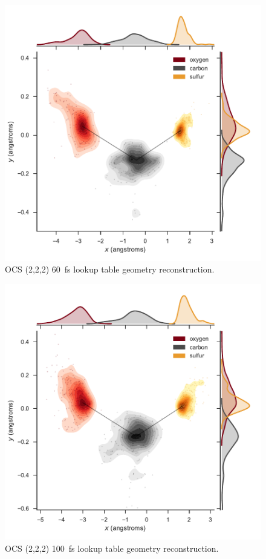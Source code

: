 \begin{figure}
  \centering
  \includegraphics[width=\textwidth]{Plots/OCS22260fsLTGeometry}
  \caption[OCS (2,2,2) \SI{60}{\fs} lookup table geometry reconstruction.]
  {OCS (2,2,2) \SI{60}{\fs} lookup table geometry reconstruction.}
  \label{fig:OCS22260fsLTGeometry}
\end{figure}

\begin{figure}
  \centering
  \includegraphics[width=\textwidth]{Plots/OCS222100fsLTGeometry}
  \caption[OCS (2,2,2) \SI{100}{\fs} lookup table geometry reconstruction.]
  {OCS (2,2,2) \SI{100}{\fs} lookup table geometry reconstruction.}
  \label{fig:OCS222100fsLTGeometry}
\end{figure}

